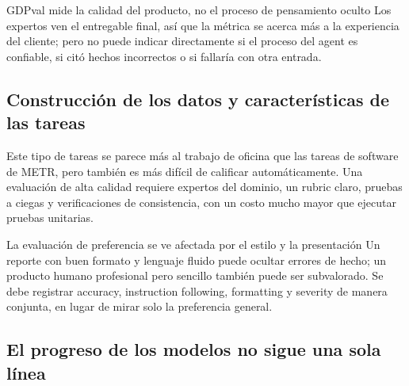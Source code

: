 \documentclass[a4paper]{article}
\begin{document}
\begin{importantbox}{GDPval mide la calidad del producto, no el proceso de pensamiento oculto}
Los expertos ven el entregable final, así que la métrica se acerca más a la experiencia del cliente; pero no puede indicar directamente si el proceso del agent es confiable, si citó hechos incorrectos o si fallaría con otra entrada.
\end{importantbox}

\subsection{Construcción de los datos y características de las tareas}



Este tipo de tareas se parece más al trabajo de oficina que las tareas de software de METR, pero también es más difícil de calificar automáticamente. Una evaluación de alta calidad requiere expertos del dominio, un rubric claro, pruebas a ciegas y verificaciones de consistencia, con un costo mucho mayor que ejecutar pruebas unitarias.

\begin{warningbox}{La evaluación de preferencia se ve afectada por el estilo y la presentación}
Un reporte con buen formato y lenguaje fluido puede ocultar errores de hecho; un producto humano profesional pero sencillo también puede ser subvalorado. Se debe registrar accuracy, instruction following, formatting y severity de manera conjunta, en lugar de mirar solo la preferencia general.
\end{warningbox}

\subsection{El progreso de los modelos no sigue una sola línea}

\end{document}
